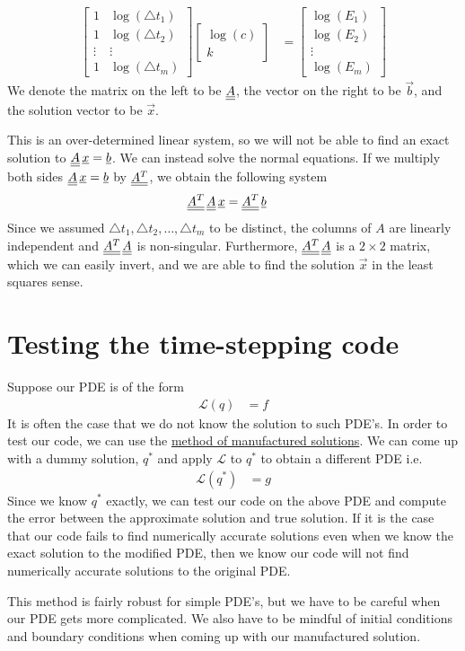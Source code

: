 \begin{align*}
	\begin{bmatrix}
		1 & \log(\triangle t_{1}) \\
		1 & \log(\triangle t_{2}) \\
		\vdots & \vdots \\
		1 & \log(\triangle t_{m})
	\end{bmatrix}
	\begin{bmatrix}
		\log(c) \\
		k
	\end{bmatrix}
	& = 
	\begin{bmatrix}
		\log(E_{1}) \\
		\log(E_{2}) \\
		\vdots \\
		\log(E_{m})
	\end{bmatrix}
\end{align*}
We denote the matrix on the left to be ${\underline{\underline{A}}}$, the vector on the right to be $\vec{b}$, and the solution vector to be $\vec{x}$.
\par 
This is an over-determined linear system, so we will not be able to find an exact solution to ${\underline{\underline{A}}} \, {\underline{x}} = {\underline{b}}$.
We can instead solve the normal equations.
If we multiply both sides ${\underline{\underline{A}}} \, {\underline{x}} = {\underline{b}}$ by ${\underline{\underline{A^{T}}}}$, we obtain the following system
\begin{align*}
	{\underline{\underline{A^{T}}}} \, {\underline{\underline{A}}} \, {\underline{x}} & = {\underline{\underline{A^{T}}}} \, {\underline{b}}
\end{align*}
Since we assumed  $\triangle t_{1}, \triangle t_{2}, \hdots, \triangle t_{m}$ to be distinct, the columns of $A$ are linearly independent and ${\underline{\underline{A^{T}}}} \, {\underline{\underline{A}}}$ is non-singular.
Furthermore, ${\underline{\underline{A^{T}}}} \, {\underline{\underline{A}}}$ is a $2 \times 2$ matrix, which we can easily invert, and we are able to find the solution $\vec{x}$ in the least squares sense.

\section*{Testing the time-stepping code}
Suppose our PDE is of the form 
\begin{align*}
	\mathcal{L}(q) & = f
\end{align*}
It is often the case that we do not know the solution to such PDE's.
In order to test our code, we can use the \underline{method of manufactured solutions}.
We can come up with a dummy solution, $q^{*}$ and apply $\mathcal{L}$ to $q^{*}$ to obtain a different PDE i.e.
\begin{align*}
	\mathcal{L}(q^{*}) & = g
\end{align*}
Since we know $q^{*}$ exactly, we can test our code on the above PDE and compute the error between the approximate solution and true solution.
If it is the case that our code fails to find numerically accurate solutions even when we know the exact solution to the modified PDE, then we know our code will not find numerically accurate solutions to the original PDE. 
\par
This method is fairly robust for simple PDE's, but we have to be careful when our PDE gets more complicated. 
We also have to be mindful of initial conditions and boundary conditions when coming up with our manufactured solution.